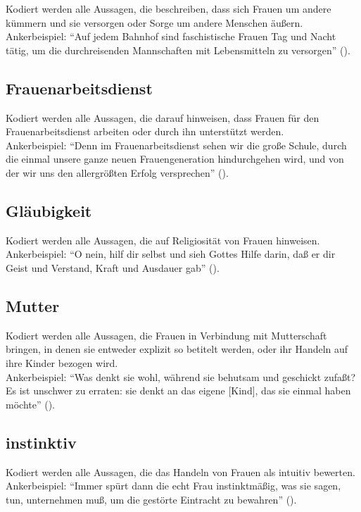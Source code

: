 \documentclass[12pt, titlepage=true, toc=bib]{scrartcl}
\begin{document}
Kodiert werden alle Aussagen, die beschreiben, dass sich Frauen um andere kümmern und sie versorgen oder Sorge um andere Menschen äußern.\\
Ankerbeispiel: "`Auf jedem Bahnhof sind faschistische Frauen Tag und Nacht tätig, um die durchreisenden Mannschaften mit Lebensmitteln zu versorgen"' (\cite[3]{medici_faschistische_1941}).

\subsection*{Frauenarbeitsdienst}

Kodiert werden alle Aussagen, die darauf hinweisen, dass Frauen für den Frauenarbeitsdienst arbeiten oder durch ihn unterstützt werden.\\
Ankerbeispiel: "`Denn im Frauenarbeitsdienst sehen wir die große Schule, durch die einmal unsere ganze neuen Frauengeneration hindurchgehen wird, und von der wir uns den allergrößten Erfolg versprechen"' (\cite[775]{a._v._s._kameradschaft_1936}).

\subsection*{Gläubigkeit}
Kodiert werden alle Aussagen, die auf Religiosität von Frauen hinweisen. \\
Ankerbeispiel: "`O nein, hilf dir selbst und sieh Gottes Hilfe darin, daß er dir Geist und Verstand, Kraft und Ausdauer gab"' (\cite[669]{maltzahn_deutsche_1936}).

\subsection*{Mutter}

Kodiert werden alle Aussagen, die Frauen in Verbindung mit Mutterschaft bringen, in denen sie entweder explizit so betitelt werden, oder ihr Handeln auf ihre Kinder bezogen wird.\\
Ankerbeispiel: "`Was denkt sie wohl, während sie behutsam und geschickt zufaßt? Es ist unschwer zu erraten: sie denkt an das eigene [Kind], das sie einmal haben möchte"' (\cite[775]{a._v._s._kameradschaft_1936}).

\subsection*{instinktiv}

Kodiert werden alle Aussagen, die das Handeln von Frauen als intuitiv bewerten.\\
Ankerbeispiel: "`Immer spürt dann die echt Frau instinktmäßig, was sie sagen, tun, unternehmen muß, um die gestörte Eintracht zu bewahren"' (\cite[36]{weinhandl_wie_1941}).
\end{document}

